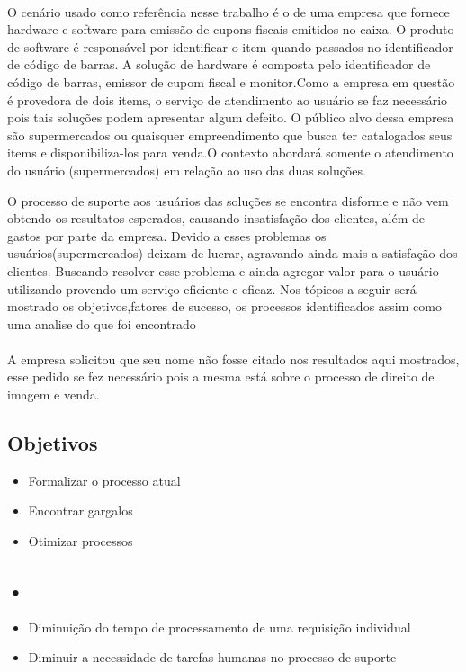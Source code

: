 \documentclass[11pt,a4paper]{article}
\begin{document}
	\paragraph{}
	O cenário usado como referência nesse trabalho é o de uma empresa que 
	fornece hardware e software para emissão de cupons fiscais emitidos no
	caixa. O produto de software é responsável por identificar o item quando passados no 
	identificador de código de barras. A solução de hardware é composta pelo identificador
	de código de barras, emissor de cupom fiscal e monitor.Como a empresa em questão é 
	provedora de dois items, o serviço de atendimento ao 
	usuário se faz necessário pois tais soluções podem apresentar algum defeito. O público alvo
	dessa empresa são supermercados ou quaisquer empreendimento que busca ter catalogados seus items
	e disponibiliza-los para venda.O contexto abordará somente o atendimento do usuário (supermercados) em 
	relação ao uso das duas soluções.
		
		O processo de suporte aos usuários das soluções se encontra disforme e não vem obtendo
	os resultatos esperados, causando insatisfação dos clientes, além de gastos por parte da empresa.
	Devido a esses problemas os usuários(supermercados) deixam de lucrar, agravando ainda mais a satisfação
	dos clientes. Buscando resolver esse problema e ainda agregar valor para o usuário utilizando provendo
	um serviço eficiente e eficaz. 
	Nos tópicos a seguir será mostrado os objetivos,fatores de sucesso, os processos
	identificados assim como uma analise do que foi encontrado 
	
	\paragraph{}A empresa solicitou que seu nome não fosse citado nos resultados aqui mostrados, esse pedido
	se fez necessário pois a mesma está sobre o processo de direito de imagem e venda.	
		
\subsection{Objetivos}
\begin{itemize}[noitemsep]
  \item Formalizar o processo atual
  \item Encontrar gargalos
  \item Otimizar processos
\end{itemize}

\subsection{•}
\begin{itemize}[noitemsep]
  \item Diminuição do tempo de processamento de uma requisição individual
  \item Diminuir a necessidade de tarefas humanas no processo de suporte
\end{itemize}
\end{document}
